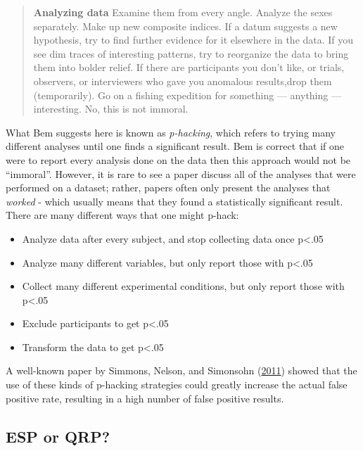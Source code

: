 \documentclass[
  12pt,
]{book}
\providecommand{\tightlist}{%
  \setlength{\itemsep}{0pt}\setlength{\parskip}{0pt}}
\begin{document}
\begin{quote}
\textbf{Analyzing data} Examine them from every angle. Analyze the sexes separately. Make up new composite indices. If a datum suggests a new hypothesis, try to find further evidence for it elsewhere in the data. If you see dim traces of interesting patterns, try to reorganize the data to bring them into bolder relief. If there are participants you don't like, or trials, observers, or interviewers who gave you anomalous results,drop them (temporarily). Go on a fishing expedition for something --- anything --- interesting. No, this is not immoral.
\end{quote}

What Bem suggests here is known as \emph{p-hacking}, which refers to trying many different analyses until one finds a significant result. Bem is correct that if one were to report every analysis done on the data then this approach would not be ``immoral''. However, it is rare to see a paper discuss all of the analyses that were performed on a dataset; rather, papers often only present the analyses that \emph{worked} - which usually means that they found a statistically significant result. There are many different ways that one might p-hack:

\begin{itemize}
\tightlist
\item
  Analyze data after every subject, and stop collecting data once p\textless.05
\item
  Analyze many different variables, but only report those with p\textless.05
\item
  Collect many different experimental conditions, but only report those with p\textless.05
\item
  Exclude participants to get p\textless.05
\item
  Transform the data to get p\textless.05
\end{itemize}

A well-known paper by Simmons, Nelson, and Simonsohn (\protect\hyperlink{ref-simm:nels:simo:2011}{2011}) showed that the use of these kinds of p-hacking strategies could greatly increase the actual false positive rate, resulting in a high number of false positive results.

\hypertarget{esp-or-qrp}{%
\subsection{ESP or QRP?}\label{esp-or-qrp}}
\end{document}
